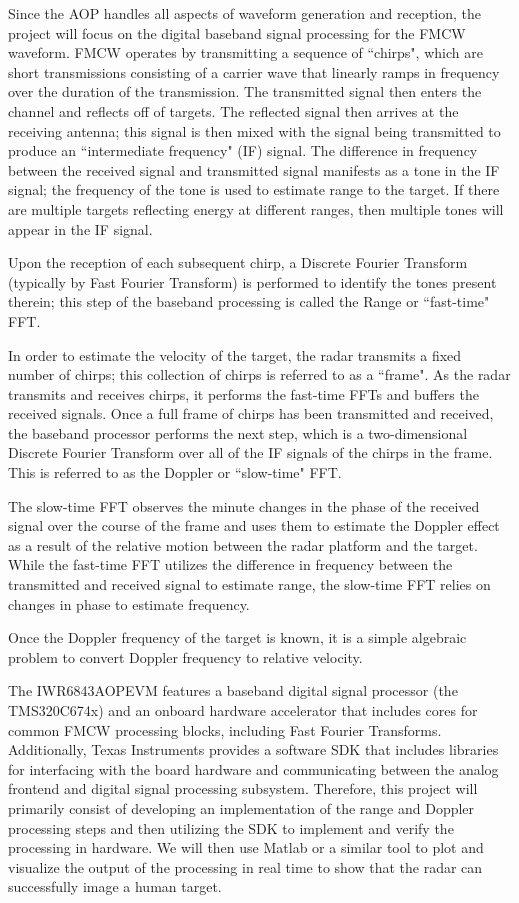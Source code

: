 \documentclass[12pt, oneside, titlepage, final]{article}
\begin{document}
	Since the AOP handles all aspects of waveform generation and reception, the project will focus on the
	digital baseband signal processing for the FMCW waveform. FMCW operates by transmitting a sequence of
	“chirps", which are short transmissions consisting of a carrier wave that linearly ramps in frequency
	over the duration of the transmission. The transmitted signal then enters the channel and reflects off
	of targets. The reflected signal then arrives at the receiving antenna; this signal is then mixed with
	the signal being transmitted to produce an “intermediate frequency" (IF) signal. The difference in
	frequency between the received signal and transmitted signal manifests as a tone in the IF signal; the
	frequency of the tone is used to estimate range to the target. If there are multiple targets
	reflecting energy at different ranges, then multiple tones will appear in the IF signal.

	Upon the reception of each subsequent chirp, a Discrete Fourier Transform (typically by Fast Fourier
	Transform) is performed to identify the tones present therein; this step of the baseband processing is
	called the Range or “fast-time" FFT.

	In order to estimate the velocity of the target, the radar transmits a fixed number of chirps; this
	collection of chirps is referred to as a “frame". As the radar transmits and receives chirps, it
	performs the fast-time FFTs and buffers the received signals. Once a full frame of chirps has been
	transmitted and received, the baseband processor performs the next step, which is a two-dimensional
	Discrete Fourier Transform over all of the IF signals of the chirps in the frame. This is referred to
	as the Doppler or “slow-time" FFT.

	The slow-time FFT observes the minute changes in the phase of the received signal over the course of
	the frame and uses them to estimate the Doppler effect as a result of the relative motion between the
	radar platform and the target. While the fast-time FFT utilizes the difference in frequency between
	the transmitted and received signal to estimate range, the slow-time FFT relies on changes in phase to
	estimate frequency.

	Once the Doppler frequency of the target is known, it is a simple algebraic problem to convert Doppler
	frequency to relative velocity.

	The IWR6843AOPEVM features a baseband digital signal processor (the TMS320C674x) and an onboard
	hardware accelerator that includes cores for common FMCW processing blocks, including Fast Fourier
	Transforms. Additionally, Texas Instruments provides a software SDK that includes libraries for
	interfacing with the board hardware and communicating between the analog frontend and digital signal
	processing subsystem. Therefore, this project will primarily consist of developing an implementation
	of the range and Doppler processing steps and then utilizing the SDK to implement and verify the
	processing in hardware. We will then use Matlab or a similar tool to plot and visualize the output of
	the processing in real time to show that the radar can successfully image a human target.
\end{document}
